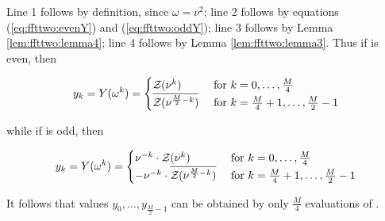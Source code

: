 Line 1 follows by definition, since $\omega=\nu^2$;
line 2 follows by equations (\ref{eq:ffttwo:evenY}) and
(\ref{eq:ffttwo:oddY});
line 3 follows by Lemma \ref{lem:ffttwo:lemma4};
line 4 follows by Lemma \ref{lem:ffttwo:lemma3}.
Thus if \dBP{\strA}{\strB} is even, then

\begin{align}
\label{eq:ffttwo:trickForRoU1}
y_k = Y(\omega^k) =
\begin{cases}
\emZof{}{\nu^k}
& \text{ for } k=0,\dots,\frac{M}{4} \\
\overline{\emZof{}{\nu^{\frac{M}{2}-k}}}
& \text{ for } k=\frac{M}{4}+1,\dots,\frac{M}{2}-1 \\
\end{cases}
\end{align}

while if \dBP{\strA}{\strB} is odd, then

\begin{align}
\label{eq:ffttwo:trickForRoU2}
y_k = Y(\omega^k) =
\begin{cases}
\nu^{-k} \cdot \emZof{}{\nu^k}
& \text{ for } k=0,\dots,\frac{M}{4} \\
-\nu^{-k} \cdot \overline{\emZof{}{\nu^{\frac{M}{2}-k}}}
& \text{ for } k=\frac{M}{4}+1,\dots,\frac{M}{2}-1 \\
\end{cases}
\end{align}

It follows that values $y_0,\dots,y_{\frac{M}{2}-1}$ can be obtained by only
$\frac{M}{4}$ evaluations of \emZ{}.

